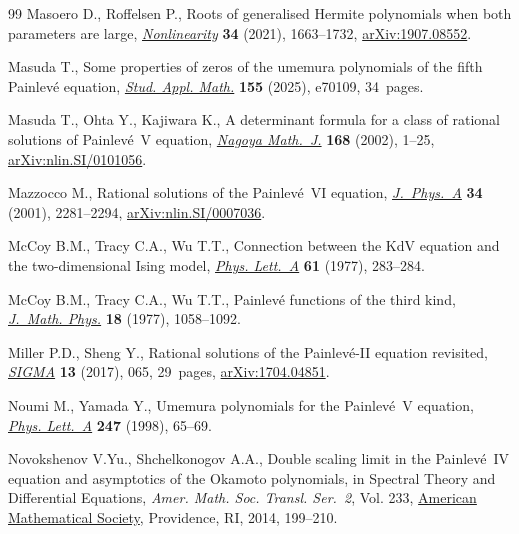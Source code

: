\documentclass[10pt,a4paper]{amsart}
\numberwithin{equation}{section}
\theoremstyle{definition}
\begin{document}
\begin{thebibliography}{99}
Masoero D., Roffelsen P., Roots of generalised {H}ermite polynomials when both
 parameters are large,
 \href{https://doi.org/10.1088/1361-6544/abdd93}{\textit{Nonlinearity}}
 \textbf{34} (2021), 1663--1732,
 \href{http://arxiv.org/abs/1907.08552}{arXiv:1907.08552}.

Masuda T., Some properties of zeros of the umemura polynomials of the fifth
 {P}ainlev\'e equation,
 \href{https://doi.org/10.1111/sapm.70109}{\textit{Stud. Appl. Math.}}
 \textbf{155} (2025), e70109, 34~pages.

Masuda T., Ohta Y., Kajiwara K., A determinant formula for a class of rational
 solutions of {P}ainlev\'e~{V} equation,
 \href{https://doi.org/10.1017/S0027763000008321}{\textit{Nagoya Math.~J.}}
 \textbf{168} (2002), 1--25,
 \href{http://arxiv.org/abs/nlin.SI/0101056}{arXiv:nlin.SI/0101056}.

Mazzocco M., Rational solutions of the {P}ainlev\'e~{VI} equation,
 \href{https://doi.org/10.1088/0305-4470/34/11/320}{\textit{J.~Phys.~A}}
 \textbf{34} (2001), 2281--2294,
 \href{http://arxiv.org/abs/nlin.SI/0007036}{arXiv:nlin.SI/0007036}.

McCoy B.M., Tracy C.A., Wu T.T., Connection between the {K}d{V} equation and
 the two-dimensional {I}sing model,
 \href{https://doi.org/10.1016/0375-9601(77)90613-2}{\textit{Phys. Lett.~A}}
 \textbf{61} (1977), 283--284.

McCoy B.M., Tracy C.A., Wu T.T., Painlev\'e functions of the third kind,
 \href{https://doi.org/10.1063/1.523367}{\textit{J.~Math. Phys.}} \textbf{18}
 (1977), 1058--1092.

Miller P.D., Sheng Y., Rational solutions of the {P}ainlev\'e-{II} equation
 revisited, \href{https://doi.org/10.3842/SIGMA.2017.065}{\textit{SIGMA}}
 \textbf{13} (2017), 065, 29~pages,
 \href{http://arxiv.org/abs/1704.04851}{arXiv:1704.04851}.

Noumi M., Yamada Y., Umemura polynomials for the {P}ainlev\'e~{V} equation,
 \href{https://doi.org/10.1016/S0375-9601(98)00625-2}{\textit{Phys. Lett.~A}}
 \textbf{247} (1998), 65--69.

Novokshenov V.Yu., Shchelkonogov A.A., Double scaling limit in the
 {P}ainlev\'e~{IV} equation and asymptotics of the {O}kamoto polynomials, in
 Spectral {T}heory and {D}ifferential {E}quations, \textit{Amer. Math. Soc.
 Transl. Ser.~2}, Vol. 233,
 \href{https://doi.org/10.1090/trans2/233/12}{American Mathematical Society},
 Providence, RI, 2014, 199--210.


\end{thebibliography}
\end{document}
